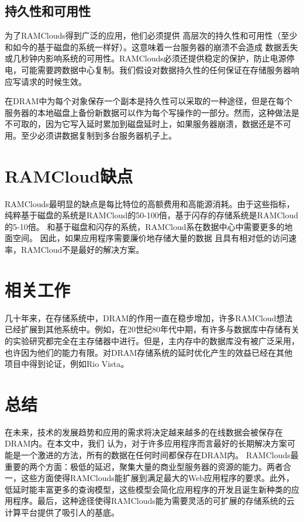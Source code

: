 \documentclass[translation]{zjutreport}
\begin{document}
\section{持久性和可用性}
为了RAMClouds得到广泛的应用，他们必须提供
高层次的持久性和可用性（至少和如今的基于磁盘的系统一样好）。这意味着一台服务器的崩溃不会造成
数据丢失或几秒钟内影响系统的可用性。RAMClouds必须还提供稳定的保护，防止电源停电，可能需要跨数据中心复制。我们假设对数据持久性的任何保证在存储服务器响应写请求的时候生效。

在DRAM中为每个对象保存一个副本是持久性可以采取的一种途径，但是在每个服务器的本地磁盘上备份新数据可以作为每个写操作的一部分。然而，这种做法是不可取的，因为它写入延时累加到磁盘延时上，如果服务器崩溃，数据还是不可用。至少必须讲数据复制到多台服务器机子上。

\chapter{RAMCloud缺点}
RAMClouds最明显的缺点是每比特位的高额费用和高能源消耗。由于这些指标，纯粹基于磁盘的系统是RAMCloud的50-100倍，基于闪存的存储系统是RAMCloud的5-10倍。
和基于磁盘和闪存的系统，RAMCloud系在数据中心中需要更多的地面空间。
因此，如果应用程序需要廉价地存储大量的数据
且具有相对低的访问速率，RAMCloud不是最好的解决方案。

\chapter{相关工作}
几十年来，在存储系统中，DRAM的作用一直在稳步增加，许多RAMCloud想法已经扩展到其他系统中。例如，在20世纪80年代中期，有许多与数据库中存储有关的实验研究都完全在主存储器中进行。但是，主内存中的数据库没有被广泛采用，也许因为他们的能力有限。对DRAM存储系统的延时优化产生的效益已经在其他项目中得到论证，例如Rio Vista。

\chapter{总结}
在未来，技术的发展趋势和应用的需求将决定越来越多的在线数据会被保存在DRAM内。在本文中，我们
认为，对于许多应用程序而言最好的长期​​解决方案可能是一个激进的方法，所有的数据在任何时间都保存在DRAM内。
RAMClouds最重要的两个方面：极低的延迟，聚集大量的商业型服务器的资源的能力。两者合一，这些方面使得RAMClouds能扩展到满足最大的Web应用程序的要求。此外，低延时能丰富更多的查询模型，这些模型会简化应用程序的开发且诞生新种类的应用程序。最后，这种途径使得RAMClouds能为需要灵活的可扩展的存储系统的云计算平台提供了吸引人的基底。

\backmatter %
\endgroup %

\clearpage %

\nocite{*}                                   %


\end{document}
